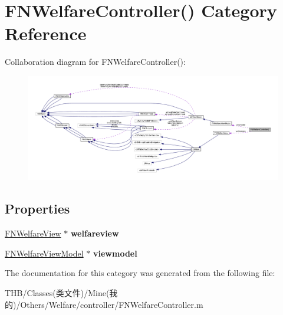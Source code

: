 \hypertarget{category_f_n_welfare_controller_07_08}{}\section{F\+N\+Welfare\+Controller() Category Reference}
\label{category_f_n_welfare_controller_07_08}


Collaboration diagram for F\+N\+Welfare\+Controller()\+:\nopagebreak
\begin{figure}[H]
\begin{center}
\leavevmode
\includegraphics[width=350pt]{category_f_n_welfare_controller_07_08__coll__graph}
\end{center}
\end{figure}
\subsection*{Properties}
\begin{DoxyCompactItemize}
\item 
\mbox{\label{category_f_n_welfare_controller_07_08_a0c7f13fa8ad6ec19185385e12ac4d159}} 
\mbox{\hyperlink{interface_f_n_welfare_view}{F\+N\+Welfare\+View}} $\ast$ {\bfseries welfareview}
\item 
\mbox{\label{category_f_n_welfare_controller_07_08_a1ebfb512a48fe23fa5d4d12050c7a429}} 
\mbox{\hyperlink{interface_f_n_welfare_view_model}{F\+N\+Welfare\+View\+Model}} $\ast$ {\bfseries viewmodel}
\end{DoxyCompactItemize}


The documentation for this category was generated from the following file\+:\begin{DoxyCompactItemize}
\item 
T\+H\+B/\+Classes(类文件)/\+Mine(我的)/\+Others/\+Welfare/controller/F\+N\+Welfare\+Controller.\+m\end{DoxyCompactItemize}

